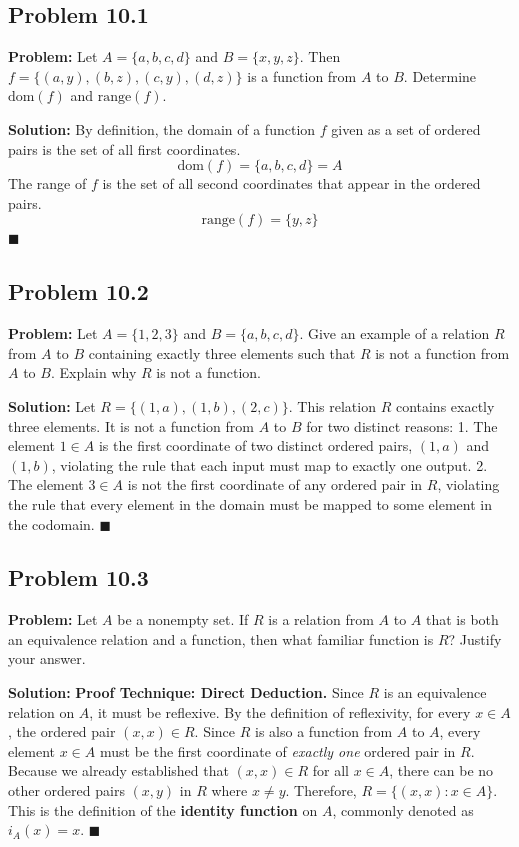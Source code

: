 \documentclass[11pt, a4paper]{article}
\theoremstyle{definition}
\theoremstyle{remark}
\begin{document}
\subsection{Problem 10.1}
\textbf{Problem:} Let $A = \{a, b, c, d\}$ and $B = \{x, y, z\}$. Then $f = \{(a, y), (b, z), (c, y), (d, z)\}$ is a function from $A$ to $B$. Determine $\text{dom}(f)$ and $\text{range}(f)$.

\textbf{Solution:}
By definition, the domain of a function $f$ given as a set of ordered pairs is the set of all first coordinates.
\[ \text{dom}(f) = \{a, b, c, d\} = A \]
The range of $f$ is the set of all second coordinates that appear in the ordered pairs.
\[ \text{range}(f) = \{y, z\} \]
$\blacksquare$

\subsection{Problem 10.2}
\textbf{Problem:} Let $A = \{1, 2, 3\}$ and $B = \{a, b, c, d\}$. Give an example of a relation $R$ from $A$ to $B$ containing exactly three elements such that $R$ is not a function from $A$ to $B$. Explain why $R$ is not a function.

\textbf{Solution:}
Let $R = \{(1, a), (1, b), (2, c)\}$. 
This relation $R$ contains exactly three elements. It is not a function from $A$ to $B$ for two distinct reasons:
1. The element $1 \in A$ is the first coordinate of two distinct ordered pairs, $(1, a)$ and $(1, b)$, violating the rule that each input must map to exactly one output.
2. The element $3 \in A$ is not the first coordinate of any ordered pair in $R$, violating the rule that every element in the domain must be mapped to some element in the codomain.
$\blacksquare$

\subsection{Problem 10.3}
\textbf{Problem:} Let $A$ be a nonempty set. If $R$ is a relation from $A$ to $A$ that is both an equivalence relation and a function, then what familiar function is $R$? Justify your answer.

\textbf{Solution:}
\textbf{Proof Technique: Direct Deduction.}
Since $R$ is an equivalence relation on $A$, it must be reflexive. By the definition of reflexivity, for every $x \in A$, the ordered pair $(x, x) \in R$.
Since $R$ is also a function from $A$ to $A$, every element $x \in A$ must be the first coordinate of \textit{exactly one} ordered pair in $R$. 
Because we already established that $(x, x) \in R$ for all $x \in A$, there can be no other ordered pairs $(x, y)$ in $R$ where $x \neq y$. 
Therefore, $R = \{(x, x) : x \in A\}$. This is the definition of the \textbf{identity function} on $A$, commonly denoted as $i_A(x) = x$.
$\blacksquare$
\end{document}

